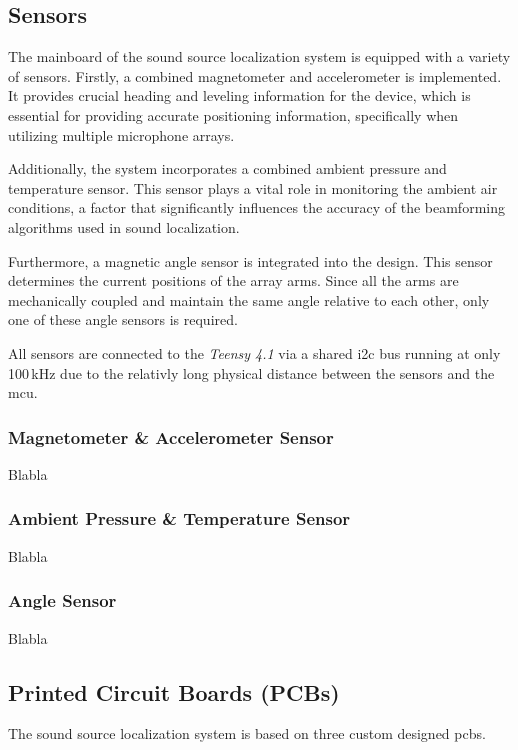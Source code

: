 \subsection{Sensors}
The mainboard of the sound source localization system is equipped with a variety of sensors.
Firstly, a combined magnetometer and accelerometer is implemented.
It provides crucial heading and leveling information for the device,
which is essential for providing accurate positioning information, specifically when utilizing multiple microphone arrays.

Additionally, the system incorporates a combined ambient pressure and temperature sensor.
This sensor plays a vital role in monitoring the ambient air conditions, a factor that significantly influences the accuracy of the beamforming algorithms used in sound localization.

Furthermore, a magnetic angle sensor is integrated into the design.
This sensor determines the current positions of the array arms.
Since all the arms are mechanically coupled and maintain the same angle relative to each other, only one of these angle sensors is required.

All sensors are connected to the \textit{Teensy 4.1} via a shared \acrshort{i2c} bus running at only 100\,kHz due to the relativly long physical distance between the sensors and the \acrshort{mcu}.
\newpage

\subsubsection{Magnetometer \& Accelerometer Sensor}
Blabla

\subsubsection{Ambient Pressure \& Temperature Sensor}
Blabla

\subsubsection{Angle Sensor}
Blabla

\newpage
\subsection{Printed Circuit Boards (PCBs)}
The sound source localization system is based on three custom designed \acrshort{pcb}s.

